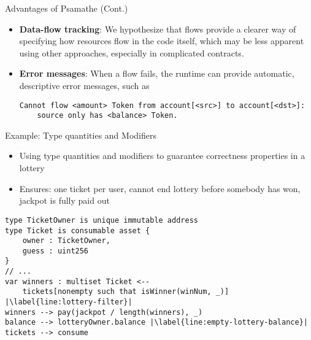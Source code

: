 \documentclass[leqno,presentation,usenames,dvipsnames]{beamer}
\begin{document}
\begin{frame}[fragile]{Advantages of Psamathe (Cont.)}
    \begin{itemize}
        \item \textbf{Data-flow tracking}: We hypothesize that flows provide a clearer way of specifying how resources flow in the code itself, which may be less apparent using other approaches, especially in complicated contracts.
        \item \textbf{Error messages}: When a flow fails, the \langName runtime can provide automatic, descriptive error messages, such as
\begin{lstlisting}[numbers=none, basicstyle=\footnotesize\ttfamily, xleftmargin=-4.5em]
Cannot flow <amount> Token from account[<src>] to account[<dst>]:
    source only has <balance> Token.
\end{lstlisting}
    \end{itemize}
\end{frame}

\begin{frame}[fragile]{Example: Type quantities and Modifiers}
    \begin{itemize}
        \item Using type quantities and modifiers to guarantee correctness properties in a lottery
        \item Ensures: one ticket per user, cannot end lottery before somebody has won, jackpot is fully paid out
    \end{itemize}
\begin{lstlisting}[language=flow, xleftmargin=-0.2em, basicstyle=\scriptsize\ttfamily]
type TicketOwner is unique immutable address
type Ticket is consumable asset {
    owner : TicketOwner,
    guess : uint256
}
// ...
var winners : multiset Ticket <--
    tickets[nonempty such that isWinner(winNum, _)] |\label{line:lottery-filter}|
winners --> pay(jackpot / length(winners), _)
balance --> lotteryOwner.balance |\label{line:empty-lottery-balance}|
tickets --> consume
\end{lstlisting}
\end{frame}
\end{document}
